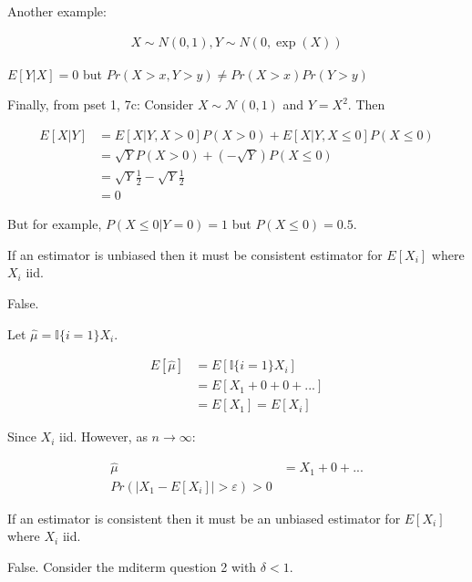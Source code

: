 \documentclass{exam}
\begin{document}
\begin{questions}
\begin{solution}
    Another example:

    \begin{align*}
        X \sim  N(0, 1), Y \sim N(0, \exp(X))
    \end{align*}

    $E[Y | X] = 0$ but $Pr(X > x, Y > y) \neq Pr(X > x) Pr(Y > y)$


    Finally, from pset 1, 7c:
    Consider $X\sim\mathcal{N}(0, 1)$ and $Y = X^2$. Then

        \begin{align*}
            E[X\vert Y] & = E[X\vert Y, X > 0] P(X > 0) + E[X\vert Y, X \leq 0] P(X \leq 0) \\
            & =  \sqrt{Y} P(X > 0) +\left(-\sqrt{Y}\right) P(X \leq 0) \\
            & =  \sqrt{Y} \frac{1}{2} -\sqrt{Y} \frac{1}{2} \\
            &=0
        \end{align*}

        But for example, $P(X\leq 0\vert Y = 0) = 1$ but $P(X\leq 0) = 0.5$. 
    \end{solution}


    \question If an estimator is unbiased then it must be consistent estimator for 
    $E[X_i]$ where $X_i$ iid.

    \begin{solution}
        False.

        Let $\hat{\mu} = \mathbb{I}\{i = 1\}X_i$.

        \begin{align*}
            E[\hat{\mu}] &= E[\mathbb{I}\{i = 1\}X_i]  \\
            &= E[X_1 + 0 + 0 + ...] \\
            &= E[X_1] = E[X_i]
        \end{align*}

        Since $X_i$ iid. However, as $n \rightarrow \infty$:

        \begin{align*}
            \hat{\mu} &= X_1 + 0 + ... \\
            Pr(|X_1 - E[X_i]| > \varepsilon) > 0
        \end{align*}
    \end{solution}


    \question If an estimator is consistent then it must be an unbiased estimator 
    for $E[X_i]$ where $X_i$ iid.


    \begin{solution}
    False. Consider the mditerm question 2 with $\delta < 1$.        




\end{solution}
\end{questions}
\end{document}
